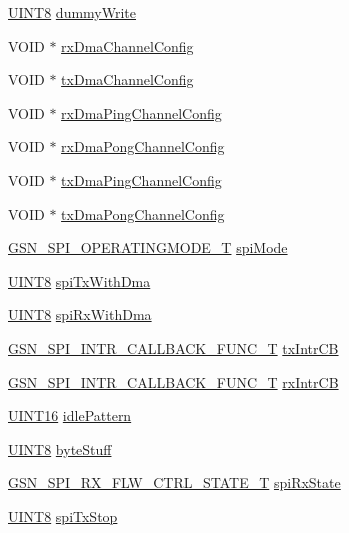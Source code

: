 \begin{DoxyCompactItemize}
\item 
\hyperlink{a00660_gab27e9918b538ce9d8ca692479b375b6a}{UINT8} \hyperlink{a00230_abdf3222930534e618e383d4015985ecf}{dummyWrite}
\item 
VOID $\ast$ \hyperlink{a00230_a8c322936bd6cb1f93600dc207bb8fd0a}{rxDmaChannelConfig}
\item 
VOID $\ast$ \hyperlink{a00230_a4c07197d124d1ed9e821f15b3b78a066}{txDmaChannelConfig}
\item 
VOID $\ast$ \hyperlink{a00230_ab10b1874804481103b375718a1788144}{rxDmaPingChannelConfig}
\item 
VOID $\ast$ \hyperlink{a00230_aa2733539030c490c8bc19d5ea2185f4a}{rxDmaPongChannelConfig}
\item 
VOID $\ast$ \hyperlink{a00230_aa0e5ef8888315014132a72402c5c8ba6}{txDmaPingChannelConfig}
\item 
VOID $\ast$ \hyperlink{a00230_a547f76d857761154a931bf0fd0f0a4ee}{txDmaPongChannelConfig}
\item 
\hyperlink{a00655_ga6621383791d81630bc4c294a7a3d292d}{GSN\_\-SPI\_\-OPERATINGMODE\_\-T} \hyperlink{a00230_ab1f5bd9a03dacfe8a653d9cc61bcf820}{spiMode}
\item 
\hyperlink{a00660_gab27e9918b538ce9d8ca692479b375b6a}{UINT8} \hyperlink{a00230_a22c3c622b95eb6c2344e62fcd5ebc0bf}{spiTxWithDma}
\item 
\hyperlink{a00660_gab27e9918b538ce9d8ca692479b375b6a}{UINT8} \hyperlink{a00230_a916c13efb27c773a6adcc6129fb9be8e}{spiRxWithDma}
\item 
\hyperlink{a00655_ga4319e7be0e14776c7cd2c7ff7ca8f2c2}{GSN\_\-SPI\_\-INTR\_\-CALLBACK\_\-FUNC\_\-T} \hyperlink{a00230_a4e134bf841774583e84c1b9d14aa928b}{txIntrCB}
\item 
\hyperlink{a00655_ga4319e7be0e14776c7cd2c7ff7ca8f2c2}{GSN\_\-SPI\_\-INTR\_\-CALLBACK\_\-FUNC\_\-T} \hyperlink{a00230_a764a17416df305e000c7f2c5d3edf2c2}{rxIntrCB}
\item 
\hyperlink{a00660_ga09f1a1fb2293e33483cc8d44aefb1eb1}{UINT16} \hyperlink{a00230_a66c4a026b5acb2b1b2974040b6936298}{idlePattern}
\item 
\hyperlink{a00660_gab27e9918b538ce9d8ca692479b375b6a}{UINT8} \hyperlink{a00230_a7607005ffbebdca79ab3c4d558d0e442}{byteStuff}
\item 
\hyperlink{a00587_a833a62a5682b1e7d499bd6334b2701f5}{GSN\_\-SPI\_\-RX\_\-FLW\_\-CTRL\_\-STATE\_\-T} \hyperlink{a00230_a7ceab17fe911810e78fcb0b93fd7ec40}{spiRxState}
\item 
\hyperlink{a00660_gab27e9918b538ce9d8ca692479b375b6a}{UINT8} \hyperlink{a00230_aace49dfcb18e1db5bc4739a89ecc1ba3}{spiTxStop}

\end{DoxyCompactItemize}
